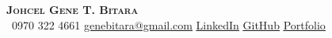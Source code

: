 \begin{center}
    \textbf{\Huge \scshape Johcel Gene T. Bitara} \\ \vspace{1pt}
     \ \small 0970 322 4661 \quad
    \href{mailto:genebitara@gmail.com}{ \underline{genebitara@gmail.com}} \quad
    \href{https://www.linkedin.com/in/johcel-gene-bitara-a413b9283}{ \underline{LinkedIn}} \quad
    \href{https://github.com/genebit}{ \underline{GitHub}} \quad
    \href{http://genbit-portfolio.web.app/}{ \underline{Portfolio}} \quad
\end{center}